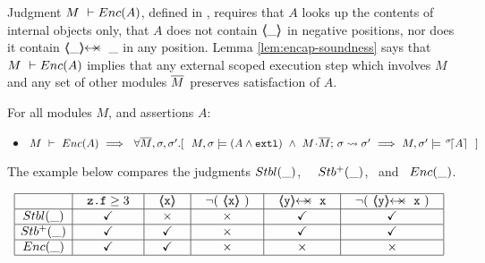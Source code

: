 Judgment $M\ \vdash {\ensuremath Enc( A )}$, %
{defined in} %
, %
{requires that} $A$ looks up the contents of
internal objects only,  %
{that $A$} does not contain  $\langle\!\!\langle \_ \rangle\!\!\rangle$  in negative positions, %
{nor does it} contain  $\protectedFrom {\_} {\_}$ %
{in any position}.  
Lemma \ref{lem:encap-soundness} says that %
$M\ \vdash {\ensuremath Enc( A )}$  %
{implies}
that any external scoped execution step which involves $M$ and any set of other modules $\overline{M}$  %
{preserves} satisfaction of $A$. %


\begin{lemma}[Encapsulation] %
\label{d:encaps}  For all modules $M$, and assertions $A$:  
\label{lem:encap-soundness}

\begin{itemize}
\item
$ \proves{M}{\encaps{A}}   \ \Longrightarrow\ \ \forall \Mtwo, \sigma, \sigma'.[   \ \  \satisfiesA{M}{\sigma}{(A  \wedge \externalexec)}\  \wedge\ { \leadstoBounded {M\madd\Mtwo}  {\sigma}{\sigma'}} %
        \  \Longrightarrow\  
    {M},{\sigma'}\models {\as \sigma A} \ \  ]$
 \end{itemize}
  
 \end{lemma}
 
 The example below compares the judgments ${Stbl( \_ )}$, \ \ ${Stb^+( \_ )}$, \ and \ ${Enc( \_ )}$. %


 $
 \begin{array}{c}
 \begin{array}{|c|c|c|c|c|c|}
 \hline
          & \ \ \prg{z.f}\geq 3  \ \ &  \ \   \inside{\prg{x}} \ \ & \ \ \neg(\ \inside{\prg{x}}\ ) \ \ & \ \ \protectedFrom {\prg{y}} {\prg{x}} \ \ &  \ \ \neg (\ \protectedFrom {\prg{y}} {\prg{x}}\ ) \ \ \\
   \hline
 \Stable  {\_}  &  \checkmark &  \times & \times &  \checkmark  &  \checkmark  \\
 \hline 
  \Pos {\_ } &  \checkmark &   \checkmark  & \times &  \checkmark  &  \checkmark  \\ 
  \hline 
  \encaps{\_ } &   \checkmark &  \checkmark & \times &   \times   &  \times \\ 
  \hline
 \end{array}
  \end{array}
 $



